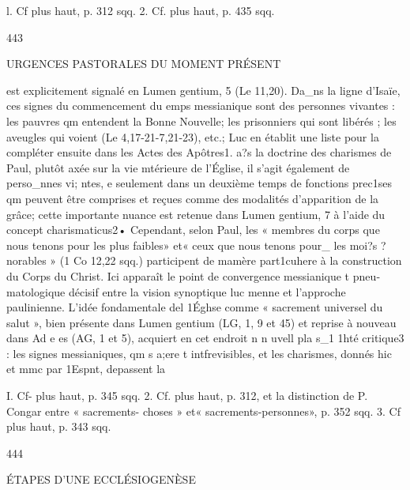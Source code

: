 l. Cf plus haut, p. 312 sqq.
2. Cf. plus haut, p. 435 sqq.

443
 
URGENCES PASTORALES DU MOMENT PRÉSENT

est explicitement signalé en Lumen gentium, 5 (Le 11,20). Da_ns la ligne d'Isaïe, ces signes du commencement du emps messianique sont des personnes vivantes : les pauvres qm entendent la Bonne Nouvelle; les prisonniers qui sont libérés ; les aveugles qui voient (Le 4,17-21-7,21-23), etc.; Luc en établit une liste pour la compléter ensuite dans les Actes des Apôtres1. a?s la doctrine des charismes de Paul, plutôt axée sur la vie mtérieure de l'Église, il s'agit également de perso_nnes vi; ntes, e seulement dans un deuxième temps de fonctions prec1ses qm peuvent être comprises et reçues comme des modalités d'apparition de la grâce; cette importante nuance est retenue dans Lumen gentium, 7 à l'aide du concept charismaticus2• Cependant, selon Paul, les « membres du corps que nous tenons pour les plus faibles» et« ceux que nous tenons pour_ les moi?s ?norables » (1 Co 12,22 sqq.) participent de mamère part1cuhere à la construction du Corps du Christ.
Ici apparaît le point de convergence messianique t pneu­
matologique décisif entre la vision synoptique luc menne et l'approche paulinienne. L'idée fondamentale del 1Éghse comme
« sacrement universel du salut », bien présente dans Lumen gentium (LG, 1, 9 et 45) et reprise à nouveau dans Ad e es (AG, 1 et 5), acquiert en cet endroit n n uvell pla s_1 1hté critique3 : les signes messianiques, qm s a;ere t intfrevisibles, et les charismes, donnés hic et mmc par 1Espnt, depassent la

I. Cf- plus haut, p. 345 sqq.
2.	Cf. plus haut, p. 312, et la distinction de P. Congar entre « sacrements- choses » et« sacrements-personnes», p. 352 sqq.
3.	Cf plus haut, p. 343 sqq.

444
 
ÉTAPES D'UNE ECCLÉSIOGENÈSE

